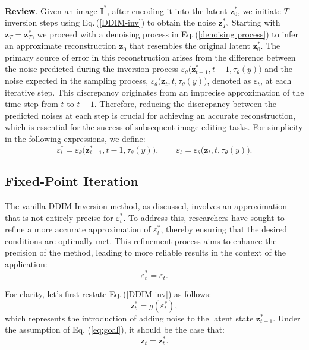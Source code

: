 \documentclass[letterpaper]{article} \usepackage{aaai25}  \usepackage{times}  \usepackage{helvet}  \usepackage{courier}  \usepackage[hyphens]{url}  \usepackage{graphicx} \urlstyle{rm} \def\UrlFont{\rm}  \usepackage{natbib}  \usepackage{caption} \frenchspacing  \setlength{\pdfpagewidth}{8.5in} \setlength{\pdfpageheight}{11in} \usepackage{algorithm}
\begin{document}
\textbf{Review}. Given an image \(\mathbf{I}^*\), after encoding it into the latent \(\mathbf{z}^*_0\), we initiate \(T\) inversion steps using Eq.\,(\ref{DDIM-inv}) to obtain the noise \(\mathbf{z}^*_T\). Starting with \(\mathbf{z}_T = \mathbf{z}^*_T\), we proceed with a denoising process in Eq.\,(\ref{denoising process}) to infer an approximate reconstruction \(\mathbf{z}_0\) that resembles the original latent  \(\mathbf{z}^*_0\). The primary source of error in this reconstruction arises from the difference between the noise predicted during the inversion process \(\varepsilon_{\theta}\big(\mathbf{z}^*_{t-1}, t-1, \tau_{\theta}(y)\big)\) and the noise expected in the sampling process, \(\varepsilon_{\theta}\big(\mathbf{z}_t, t, \tau_{\theta}(y)\big)\), denoted as \(\varepsilon_t\), at each iterative step. This discrepancy originates from an imprecise approximation of the time step from \(t\) to \(t-1\). Therefore, reducing the discrepancy between the predicted noises at each step is crucial for achieving an accurate reconstruction, which is essential for the success of subsequent image editing tasks. For simplicity in the following expressions, we define:
\begin{equation}
    \varepsilon_{t}^* = \varepsilon_{\theta}\big(\mathbf{z}^*_{t-1},t-1,\tau_{\theta}(y)\big), \qquad \varepsilon_t = \varepsilon_{\theta}\big(\mathbf{z}_t,t,\tau_{\theta}(y)\big).
\end{equation}





\subsection{Fixed-Point Iteration}
\label{sec:motivation}
The vanilla DDIM Inversion method, as discussed, involves an approximation that is not entirely precise for \(\varepsilon_t^*\). To address this, researchers have sought to refine a more accurate approximation of \(\varepsilon_t^*\), thereby ensuring that the desired conditions are optimally met. This refinement process aims to enhance the precision of the method, leading to more reliable results in the context of the application:
\begin{equation}\label{eq:goal}
    \varepsilon_t^* = \varepsilon_t.
\end{equation}


For clarity, let's first restate Eq.\,(\ref{DDIM-inv}) as follows:
\begin{equation}\label{eq:forward}
\mathbf{z}^*_t = g(\varepsilon_t^*),
\end{equation}
which represents the introduction of adding noise to the latent state $\mathbf{z}^*_{t-1}$. Under the assumption of Eq. (\ref{eq:goal}), it should be the case that:
\begin{equation}\label{eq:condition}
\mathbf{z}_t = \mathbf{z}_t^*.
\end{equation}
\end{document}

